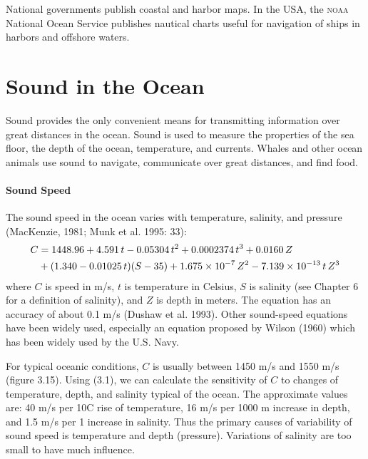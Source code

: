 National governments publish coastal and harbor maps. In the USA, the
\textsc{noaa} National Ocean Service publishes nautical charts useful for
navigation of ships in harbors and offshore waters.

\section{Sound in the Ocean}
Sound provides the only convenient means for transmitting
information over great distances in the ocean.
Sound is used to measure the properties of the sea floor,
the depth of the ocean, temperature, and currents. Whales and other ocean animals use sound to
navigate, communicate over great distances, and find food.

\paragraph{Sound Speed}
The sound speed in the ocean varies with
temperature, salinity, and pressure (MacKenzie, 1981; Munk
et al. 1995: 33):
\begin{align}
  C & = 1448.96 + 4.591\,t - 0.05304\,t^2 + 0.0002374\,t^3+ 0.0160\,Z \\
  &+ (1.340 - 0.01025\,t) (S - 35) + 1.675 \times 10^{-7}\,Z^2 - 7.139 \times
10^{-13}\,t\,Z^3 \notag
\end{align}
where $C$ is speed in m/s, $t$ is temperature in Celsius, $S$ is salinity (see Chapter 6 for a definition of salinity), and $Z$ is
depth in meters. The equation has an accuracy of
about 0.1 m/s (Dushaw et al. 1993). Other sound-speed equations have been widely used,
especially an equation proposed by Wilson (1960) which has been widely used by
the U.S. Navy.

For typical oceanic conditions, $C$ is usually between 1450 m/s and 1550 m/s (figure
3.15). Using (3.1), we can calculate the sensitivity of $C$ to changes of
temperature, depth, and salinity typical of the ocean. The approximate values are:
40 m/s per 10\degrees C rise of temperature, 16 m/s per 1000 m increase in depth,
and 1.5 m/s per 1 increase in salinity. Thus the primary causes of variability
of sound speed is temperature and depth (pressure).
Variations of salinity are too small to have much influence.

